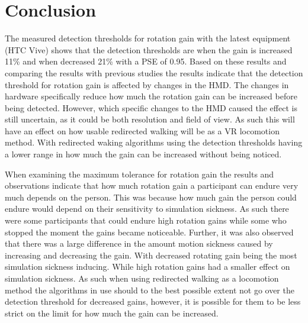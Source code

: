 \chapter{Conclusion}
\label{chap:conclusion}


The measured detection thresholds for rotation gain with the latest equipment (HTC Vive) shows that the detection thresholds are when the gain is increased 11\% and when decreased 21\% with a PSE of 0.95. Based on these results and comparing the results with previous studies the results indicate that the detection threshold for rotation gain is affected by changes in the HMD. The changes in hardware specifically reduce how much the rotation gain can be increased before being detected. However, which specific changes to the HMD caused the effect is still uncertain, as it could be both resolution and field of view. As such this will have an effect on how usable redirected walking will be as a VR locomotion method. With redirected waking algorithms using the detection thresholds having a lower range in how much the gain can be increased without being noticed.

When examining the maximum tolerance for rotation gain the results and observations indicate that how much rotation gain a participant can endure very much depends on the person. This was because how much gain the person could endure would depend on their sensitivity to simulation sickness. As such there were some participants that could endure high rotation gains while some who stopped the moment the gains became noticeable. Further, it was also observed that there was a large difference in the amount motion sickness caused by increasing and decreasing the gain. With decreased rotating gain being the most simulation sickness inducing. While high rotation gains had a smaller effect on simulation sickness. As such when using redirected walking as a locomotion method the algorithms in use should to the best possible extent not go over the detection threshold for decreased gains, however, it is possible for them to be less strict on the limit for how much the gain can be increased.

